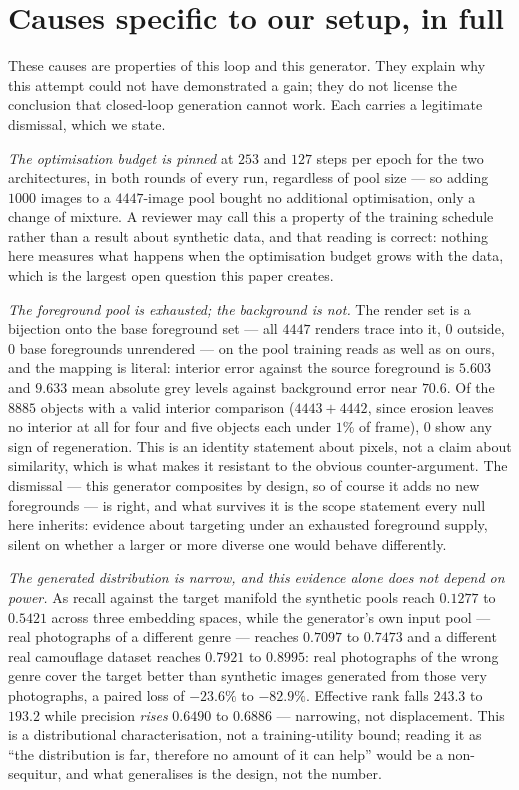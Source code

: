 \documentclass{article} %
\begin{document}


\section{Causes specific to our setup, in full}
\label{app:tier1}

These causes are properties of this loop and this generator. They explain why this
attempt could not have demonstrated a gain; they do not license the conclusion that closed-loop
generation cannot work. Each carries a legitimate dismissal, which we state.

\emph{The optimisation budget is pinned} at $253$ and $127$ steps per epoch for the two
architectures, in both rounds of every run, regardless of pool size --- so adding $1000$ images to a
$4447$-image pool bought no additional optimisation, only a change of mixture. A reviewer may call
this a property of the training schedule rather than a result about synthetic data, and that reading
is correct: nothing here measures what happens when the optimisation budget grows with the data,
which is the largest open question this paper creates.

\emph{The foreground pool is exhausted; the background is not.} The render set is a bijection onto the
base foreground set --- all $4447$ renders trace into it, $0$ outside, $0$ base foregrounds unrendered
--- on the pool training reads as well as on ours, and the mapping is literal: interior error against
the source foreground is $5.603$ and $9.633$ mean absolute grey levels against background error near
$70.6$. Of the $8885$ objects with a valid interior comparison ($4443+4442$, since erosion leaves no
interior at all for four and five objects each under $1\%$ of frame), $0$ show any sign of
regeneration. This is an identity statement
about pixels, not a claim about similarity, which is what makes it resistant to the obvious
counter-argument. The dismissal --- this generator composites by design, so of course it adds no new
foregrounds --- is right, and what survives it is the scope statement every null here inherits:
evidence about targeting under an exhausted foreground supply, silent on whether a larger or more
diverse one would behave differently.

\emph{The generated distribution is narrow, and this evidence alone does not depend on power.} As
recall against the target manifold the synthetic pools reach $0.1277$ to $0.5421$ across three
embedding spaces, while the generator's own input pool --- real photographs of a different genre ---
reaches $0.7097$ to $0.7473$ and a different real camouflage dataset reaches $0.7921$ to $0.8995$: real
photographs of the wrong genre cover the target better than synthetic images generated from those very
photographs, a paired loss of $-23.6\%$ to $-82.9\%$. Effective rank falls $243.3$ to $193.2$ while
precision \emph{rises} $0.6490$ to $0.6886$ --- narrowing, not displacement. This is a distributional
characterisation, not a training-utility bound; reading it as ``the distribution is far, therefore no
amount of it can help'' would be a non-sequitur, and what generalises is the design, not the number.
\end{document}

